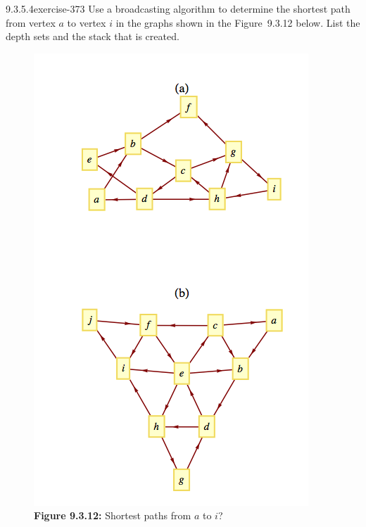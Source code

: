 \documentclass[twoside,10pt,]{book}
\numberwithin{equation}{section}
\begin{document}
\begin{divisionsolution}{9.3.5.4}{}{exercise-373}%
\hypertarget{p-3221}{}%
Use a broadcasting algorithm to determine the shortest path from vertex \(a\) to vertex \(i\) in the graphs shown in the Figure~9.3.12 below. List the depth sets and the stack that is created.%
\begin{figure}
\centering
\includegraphics[width=0.6\linewidth]{images/fig-exercise-9-3-4.png}
\caption*{\textbf{Figure 9.3.12:} Shortest paths from \(a\) to \(i\)?}
\end{figure}
\end{divisionsolution}%
\end{document}
